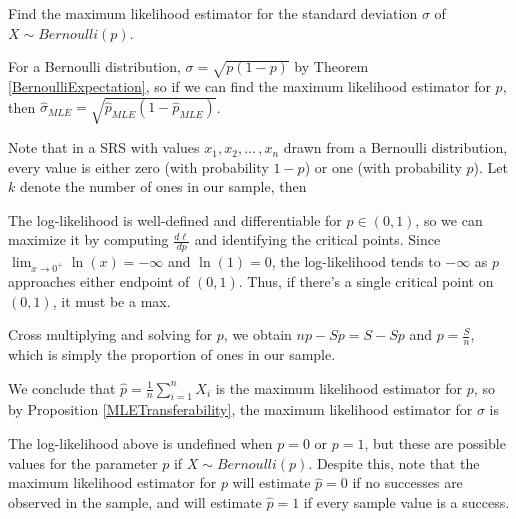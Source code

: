 \begin{examp}Find the maximum likelihood estimator for the standard deviation $\sigma$ of $X \sim Bernoulli(p)$.
\par
\noindent For a Bernoulli distribution, $\sigma = \sqrt{p(1-p)}$ by Theorem \ref{BernoulliExpectation}, so if we can find the maximum likelihood estimator for $p$, then $\widehat{\sigma}_{MLE} = \sqrt{\widehat{p}_{MLE}(1-\widehat{p}_{MLE})}$. 
\par
\noindent Note that in a SRS with values $x_1, x_2, ...\,,x_n$ drawn from a Bernoulli distribution, every value is either zero (with probability $1-p$) or one (with probability $p$). Let $k$ denote the number of ones in our sample, then
\par
\noindent The log-likelihood is well-defined and differentiable for $p \in (0,1)$, so we can maximize it by computing $\frac{d\ell}{dp}$ and identifying the critical points. Since $\lim_{x \to 0^{+}} \ln(x) = -\infty$ and $\ln(1) = 0$, the log-likelihood tends to $-\infty$ as $p$ approaches either endpoint of $(0,1)$. Thus, if there's a single critical point on $(0,1)$, it must be a max.
\par
\noindent Cross multiplying and solving for $p$, we obtain $np - Sp = S-Sp$ and $p = \frac{S}{n}$, which is simply the proportion of ones in our sample.
\par
\noindent We conclude that $\widehat{p} = \frac{1}{n}\sum_{i=1}^{n}X_i$ is the maximum likelihood estimator for $p$, so by Proposition \ref{MLETransferability}, the maximum likelihood estimator for $\sigma$ is
\end{examp}
\par
\noindent\rmk The log-likelihood above is undefined when $p = 0$ or $p=1$, but these are possible values for the parameter $p$ if $X \sim Bernoulli(p)$. Despite this, note that the maximum likelihood estimator for $p$ will estimate $\widehat{p} = 0$ if no successes are observed in the sample, and will estimate $\widehat{p} = 1$ if every sample value is a success.


